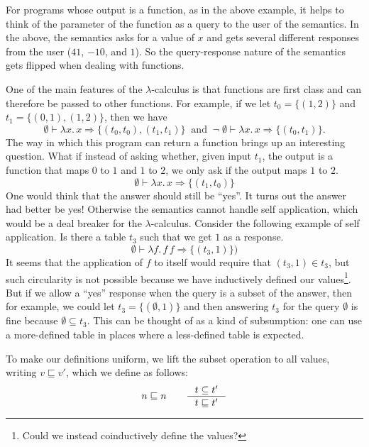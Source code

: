 \documentclass{tufte-handout}
\newcommand{\LAM}[1]{\lambda #1.\,}
\newcommand{\APP}[0]{\,}
\begin{document}
For programs whose output is a function, as in the above example, it
helps to think of the parameter of the function as a query to the user
of the semantics.  In the above, the semantics asks for a value of $x$
and gets several different responses from the user ($41$, $-10$, and
$1$). So the query-response nature of the semantics gets flipped when
dealing with functions.
%

One of the main features of the $\lambda$-calculus is that functions
are first class and can therefore be passed to other functions. For
example, if we let $t_0 = \{ (1,2) \}$ and $t_1
= \{ (0,1), (1,2) \}$, then we have
\[
  \emptyset \vdash \LAM{x} x \Rightarrow \{  (t_0, t_0), (t_1,t_1) \} 
  \;\;\text{and}\;\;
  \neg\; \emptyset \vdash \LAM{x} x \Rightarrow \{ (t_0, t_1) \}.
\]
The way in which this program can return a function brings up an
interesting question. What if instead of asking whether, given input
$t_1$, the output is a function that maps $0$ to $1$ and $1$ to $2$,
we only ask if the output maps $1$ to $2$.
\[
  \emptyset \vdash \LAM{x} x \Rightarrow
     \{  (t_1,t_0) \} 
\]
One would think that the answer should still be ``yes''.  It turns out
the answer had better be yes! Otherwise the semantics cannot handle
self application, which would be a deal breaker for the
$\lambda$-calculus. Consider the following example of self application.
Is there a table $t_3$ such that we get $1$ as a response.
\[
  \emptyset \vdash \LAM{f} f \APP f \Rightarrow
     \{ (t_3,1) \})
\]
It seems that the application of $f$ to itself would require that
$(t_3,1) \in t_3$, but such circularity is not possible because we
have inductively defined our values\footnote{Could we instead
  coinductively define the values?}.
%
But if we allow a ``yes'' response when the query is a subset of the
answer, then for example, we could let $t_3 = \{ (\emptyset,1) \}$ and
then answering $t_3$ for the query $\emptyset$ is fine because
$\emptyset \subseteq t_3$. This can be thought of as a kind of
subsumption: one can use a more-defined table in places where a
less-defined table is expected.

To make our definitions uniform, we lift the subset operation to all
values, writing $v \sqsubseteq v'$, which we define as follows:
\[
    n \sqsubseteq n
    \qquad
    \inference{t \subseteq t'}{t \sqsubseteq t'}
\]
\end{document}
